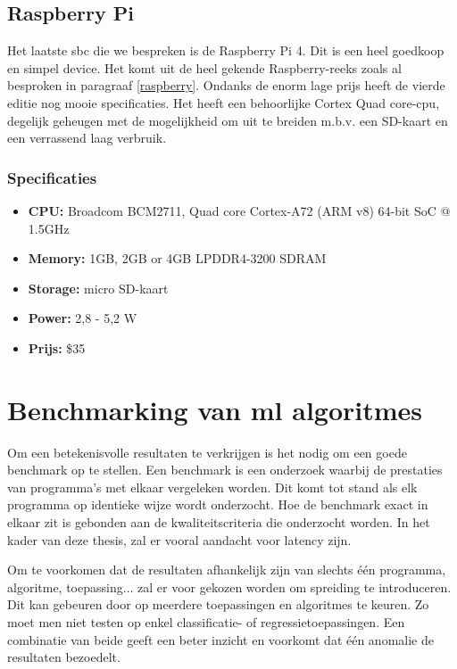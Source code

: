 	
	\subsection{Raspberry Pi}
	Het laatste \gls{sbc} die we bespreken is de Raspberry Pi 4\citep{bron:rpi4}. Dit is een heel goedkoop en simpel device. Het komt uit de heel gekende Raspberry-reeks zoals al besproken in paragraaf \ref{raspberry}. Ondanks de enorm lage prijs heeft de vierde editie nog mooie specificaties. Het heeft een behoorlijke Cortex Quad core-\gls{cpu}, degelijk geheugen met de mogelijkheid om uit te breiden m.b.v. een SD-kaart en een verrassend laag verbruik. 
	
		\subsubsection{Specificaties}
		\begin{itemize}
			\item \textbf{CPU:} Broadcom BCM2711, Quad core Cortex-A72 (ARM v8) 64-bit SoC @ 1.5GHz
			\item \textbf{Memory:} 1GB, 2GB or 4GB LPDDR4-3200 SDRAM 
			\item \textbf{Storage:}  micro SD-kaart
			\item \textbf{Power:} 2,8 - 5,2 W
			\item \textbf{Prijs:} \$35
		\end{itemize}	
	


\section{Benchmarking van \gls{ml} algoritmes}
\label{benchmark}

Om een betekenisvolle resultaten te verkrijgen is het nodig om een goede benchmark op te stellen. Een benchmark is een onderzoek waarbij de prestaties van programma's met elkaar vergeleken worden. Dit komt tot stand als elk programma op identieke wijze wordt onderzocht. Hoe de benchmark exact in elkaar zit is gebonden aan de kwaliteitscriteria die onderzocht worden. In het kader van deze thesis, zal er vooral aandacht voor latency zijn.

Om te voorkomen dat de resultaten afhankelijk zijn van slechts \'e\'en programma, algoritme, toepassing$\dots$ zal er voor gekozen worden om spreiding te introduceren. Dit kan gebeuren door op meerdere toepassingen en algoritmes te keuren. Zo moet men niet testen op enkel classificatie- of regressietoepassingen. Een combinatie van beide geeft een beter inzicht en voorkomt dat \'e\'en anomalie de resultaten bezoedelt. 


